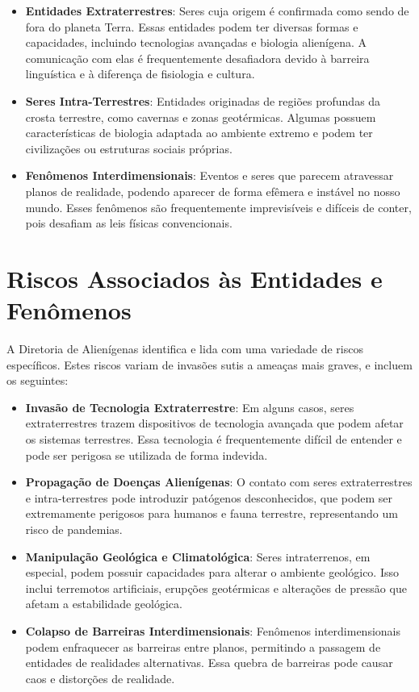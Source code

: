 \begin{itemize}
    \item \textbf{Entidades Extraterrestres}: Seres cuja origem é confirmada como sendo de fora do planeta Terra. Essas entidades podem ter diversas formas e capacidades, incluindo tecnologias avançadas e biologia alienígena. A comunicação com elas é frequentemente desafiadora devido à barreira linguística e à diferença de fisiologia e cultura.
    \item \textbf{Seres Intra-Terrestres}: Entidades originadas de regiões profundas da crosta terrestre, como cavernas e zonas geotérmicas. Algumas possuem características de biologia adaptada ao ambiente extremo e podem ter civilizações ou estruturas sociais próprias.
    \item \textbf{Fenômenos Interdimensionais}: Eventos e seres que parecem atravessar planos de realidade, podendo aparecer de forma efêmera e instável no nosso mundo. Esses fenômenos são frequentemente imprevisíveis e difíceis de conter, pois desafiam as leis físicas convencionais.
\end{itemize}

\section{Riscos Associados às Entidades e Fenômenos}
A Diretoria de Alienígenas identifica e lida com uma variedade de riscos específicos. Estes riscos variam de invasões sutis a ameaças mais graves, e incluem os seguintes:

\begin{itemize}
    \item \textbf{Invasão de Tecnologia Extraterrestre}: Em alguns casos, seres extraterrestres trazem dispositivos de tecnologia avançada que podem afetar os sistemas terrestres. Essa tecnologia é frequentemente difícil de entender e pode ser perigosa se utilizada de forma indevida.
    \item \textbf{Propagação de Doenças Alienígenas}: O contato com seres extraterrestres e intra-terrestres pode introduzir patógenos desconhecidos, que podem ser extremamente perigosos para humanos e fauna terrestre, representando um risco de pandemias.
    \item \textbf{Manipulação Geológica e Climatológica}: Seres intraterrenos, em especial, podem possuir capacidades para alterar o ambiente geológico. Isso inclui terremotos artificiais, erupções geotérmicas e alterações de pressão que afetam a estabilidade geológica.
    \item \textbf{Colapso de Barreiras Interdimensionais}: Fenômenos interdimensionais podem enfraquecer as barreiras entre planos, permitindo a passagem de entidades de realidades alternativas. Essa quebra de barreiras pode causar caos e distorções de realidade.
\end{itemize}


